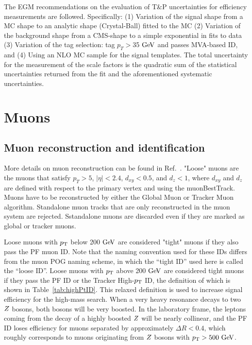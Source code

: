 
The EGM recommendations on the evaluation of T\&P uncertainties for efficiency measurements are followed. Specifically: 
(1) Variation of the signal shape from a MC shape to an analytic shape (Crystal-Ball) fitted to the MC
(2) Variation of the background shape from a CMS-shape to a simple exponential in fits to data
(3) Variation of the tag selection: tag $p_{T}>$35 $\mathrm{Ge\kern -0.1em V}$ and passes MVA-based ID, and
(4) Using an NLO MC sample for the signal templates.
The total uncertainty for the measurement of the scale factors is the quadratic sum of the statistical uncertainties returned from the fit and the aforementioned systematic uncertainties.


\section{Muons}

\subsection{Muon reconstruction and identification}
\label{sec:muonReco}

More details on muon reconstruction can be found in Ref.~\cite{AN-15-277}.
"Loose" muons are the muons that satisfy  
$p_T > 5$, $|\eta| < 2.4$, $d_{xy}< 0.5$, and $d_z < 1$, where $d_{xy}$ and $d_z$ are 
defined with respect to the primary vertex and using the muonBestTrack. Muons have to be 
reconstructed by either the Global Muon or Tracker Muon algorithm. Standalone 
muon tracks that are only reconstructed in the muon system are rejected.
Sstandalone muons are discarded even if they are marked as global or tracker muons. 

Loose muons with $p_{\rm{T}}$ below 200 $\mathrm{Ge\kern -0.1em V}$ are considered "tight" muons if they 
also pass the PF muon ID. Note that the naming 
convention used for these IDs differs from the muon POG naming scheme, in which
the ``tight ID'' used here is called the ``loose ID''. Loose muons with $p_{\rm{T}}$ 
above 200 $\mathrm{Ge\kern -0.1em V}$ are considered tight muons if they pass the PF ID or the Tracker
High-$p_{\rm{T}}$ ID, the definition of which is shown in Table~\ref{tab:highPtID}.
This relaxed definition is used to increase signal efficiency for the high-mass
search. When a very heavy resonance decays to two $Z$ bosons, both bosons
will be very boosted. In the laboratory frame, the leptons coming from the decay of
a highly boosted $Z$ will be nearly collinear, and the PF ID loses 
efficiency for muons separated by approximately $\Delta R < 0.4$, which roughly 
corresponds to muons originating from $Z$ bosons with $p_{\rm{T}} > 500\ \mathrm{Ge\kern -0.1em V}$.

